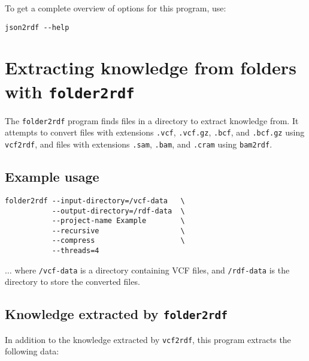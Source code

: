 To get a complete overview of options for this program, use:
\begin{siderules}
\begin{verbatim}
json2rdf --help
\end{verbatim}
\end{siderules}

\section{Extracting knowledge from folders with \texttt{folder2rdf}}
\label{sec:folder2rdf}

  The \texttt{folder2rdf} program finds files in a directory to extract
  knowledge from.  It attempts to convert files with extensions
  \texttt{.vcf}, \texttt{.vcf.gz}, \texttt{.bcf}, and \texttt{.bcf.gz}
  using \texttt{vcf2rdf}, and files with extensions \texttt{.sam},
  \texttt{.bam}, and \texttt{.cram} using \texttt{bam2rdf}.

\subsection{Example usage}

\begin{siderules}
\begin{verbatim}
folder2rdf --input-directory=/vcf-data   \
           --output-directory=/rdf-data  \
           --project-name Example        \
           --recursive                   \
           --compress                    \
           --threads=4
\end{verbatim}
\end{siderules}

  $\ldots{}$ where \texttt{/vcf-data} is a directory containing VCF files,
  and \texttt{/rdf-data} is the directory to store the converted files.

\subsection{Knowledge extracted by \texttt{folder2rdf}}

  In addition to the knowledge extracted by \texttt{vcf2rdf}, this program
  extracts the following data:

